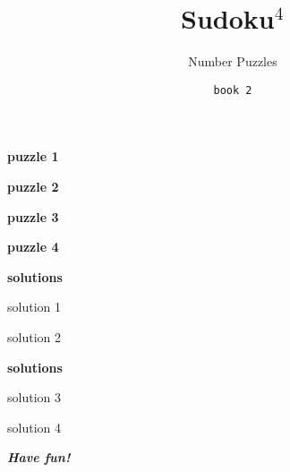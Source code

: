 \documentclass[fontsize=24pt,letterpaper]{scrartcl}
\title{Sudoku$^4$}
\author{Number Puzzles}
\date{\texttt{book 2}}
\renewcommand*\sudokuformat[1]{\Large\sffamily#1}
\begin{document}
\maketitle
\setcounter{page}{0}
\thispagestyle{empty}
\clearpage

{\Large \bfseries \sffamily puzzle 1}
\vspace{2cm}

\clearpage
\begin{flushright}
{\Large \bfseries \sffamily puzzle 2}
\end{flushright}
\vspace{1cm}


\clearpage
{\Large \bfseries \sffamily puzzle 3}
\vspace{2cm}


\clearpage
\begin{flushright}
{\Large \bfseries \sffamily puzzle 4}
\end{flushright}
\vspace{1cm}


\clearpage

{\Large \bfseries \sffamily solutions}
\setlength\sudokusize{8cm}
\renewcommand*\sudokuformat[1]{\sffamily#1}
\vspace{1cm}

\begin{center}
    solution 1
\end{center}
\vspace{0.2cm}

\begin{center}
    solution 2
\end{center}


\clearpage
\begin{flushright}
{\Large \bfseries \sffamily solutions}
\end{flushright}
\vspace{1cm}

\begin{center}
    solution 3
\end{center}

\begin{center}
    solution 4
\end{center}
\clearpage

{\centering\Huge\itshape\bfseries Have fun!\par}
\end{document}

